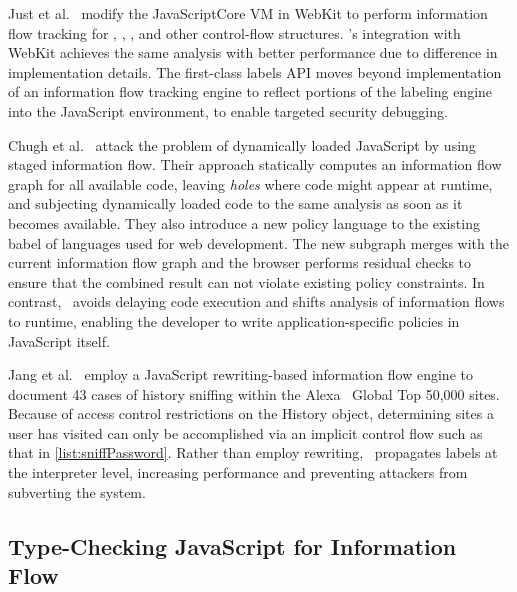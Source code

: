 Just et al.~\cite{just.etal+11} modify the JavaScriptCore VM in WebKit to perform information flow tracking for , , , and other control-flow structures.
\FlowCore's integration with WebKit achieves the same analysis with better performance due to difference in implementation details.
The first-class labels API moves beyond implementation of an information flow tracking engine to reflect portions of the labeling engine into the JavaScript environment, to enable targeted security debugging.

Chugh et al.~\cite{chugh.etal+09} attack the problem of dynamically loaded JavaScript by using staged information flow.
Their approach statically computes an information flow graph for all available code, leaving \textit{holes} where code might appear at runtime, and subjecting dynamically loaded code to the same analysis as soon as it becomes available.
They also introduce a new policy language to the existing babel of languages used for web development.
The new subgraph merges with the current information flow graph and the browser performs residual checks to ensure that the combined result can not violate existing policy constraints.
In contrast, \FlowCore\ avoids delaying code execution and shifts analysis of information flows to runtime, enabling the developer to write application-specific policies in JavaScript itself.

Jang et al.~\cite{jang.etal+10} employ a JavaScript rewriting-based information flow engine to document 43 cases of history sniffing within the Alexa~\cite{alexa} Global Top 50,000 sites.
Because of access control restrictions on the History object, determining sites a user has visited can only be accomplished via an implicit control flow such as that in \ref{list:sniffPassword}.
Rather than employ rewriting, \FlowCore\ propagates labels at the interpreter level, increasing performance and preventing attackers from subverting the system.

\subsection{Type-Checking JavaScript for Information Flow}


